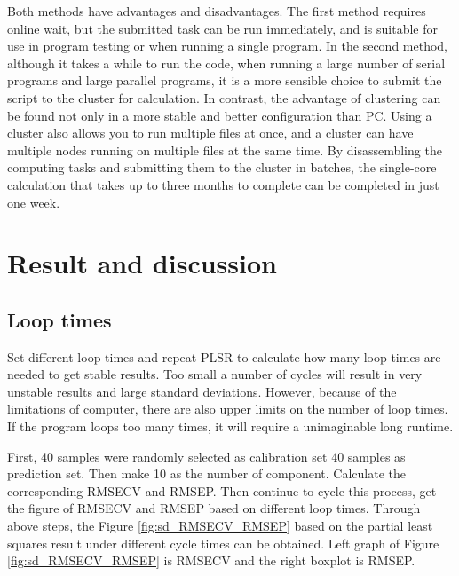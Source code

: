 \documentclass[a4paper,12pt,titlepage]{article} %
\numberwithin{equation}{section}  %
\begin{document}
	Both methods have advantages and disadvantages.
	The first method requires online wait, but the submitted task can be run immediately, and is suitable for use in program testing or when running a single program. In the second method, although it takes a while to run the code, when running a large number of serial programs and large parallel programs, it is a more sensible choice to submit the script to the cluster for calculation. In contrast, the advantage of clustering can be found not only in a more stable and better configuration than PC. Using a cluster also allows you to run multiple files at once, and a cluster can have multiple nodes running on multiple files at the same time. By disassembling the computing tasks and submitting them to the cluster in batches, the single-core calculation that takes up to three months to complete can be completed in just one week.
	
	\section{Result and discussion}
	\label{sec:result}
	
	\subsection{Loop times}
	\label{sec:Loop times}
	
	Set different loop times and repeat PLSR to calculate how many loop times are needed to get stable results. Too small a number of cycles will result in very unstable results and large standard deviations. However, because of the limitations of computer, there are also upper limits on the number of loop times. If the program loops too many times, it will require a unimaginable long runtime.
	
	First, 40 samples were randomly selected as calibration set 40 samples as prediction set. Then make 10 as the number of component. Calculate the corresponding RMSECV and RMSEP. Then continue to cycle this process, get the figure of RMSECV and RMSEP based on different loop times. Through above steps, the  Figure \ref{fig:sd_RMSECV_RMSEP} based on the partial least squares result under different cycle times can be obtained. Left graph of Figure \ref{fig:sd_RMSECV_RMSEP} is RMSECV and the right boxplot is RMSEP.
	
\end{document}
